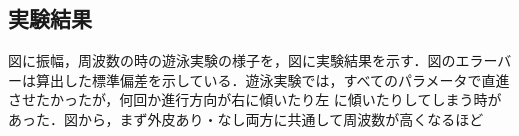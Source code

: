 \subsection{実験結果}
図に振幅，周波数の時の遊泳実験の様子を，図に実験結果を示す．図のエラーバーは算出した標準偏差を示している．遊泳実験では，すべてのパラメータで直進させたかったが，何回か進行方向が右に傾いたり左
に傾いたりしてしまう時があった．図から，まず外皮あり・なし両方に共通して周波数が高くなるほど


